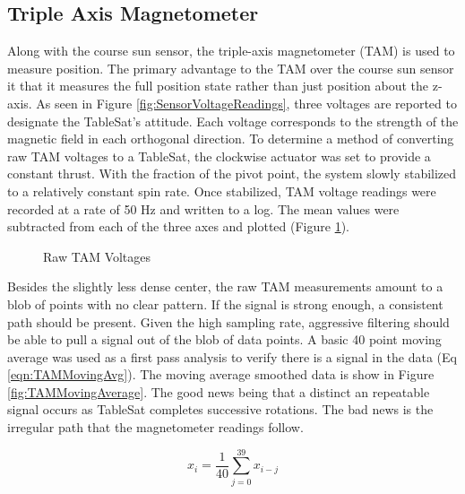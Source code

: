 \subsection{Triple Axis Magnetometer}
\label{subsec:TripleAxisMagnetometer}

Along with the course sun sensor, the triple-axis magnetometer (TAM) is used to measure position.  The primary advantage to the TAM over the course sun sensor it that it measures the full position state rather than just position about the z-axis.  As seen in Figure \ref{fig:SensorVoltageReadings}, three voltages are reported to designate the TableSat's attitude.  Each voltage corresponds to the strength of the magnetic field in each orthogonal direction.  To determine a method of converting raw TAM voltages to a TableSat, the clockwise actuator was set to provide a constant thrust.  With the fraction of the pivot point, the system slowly stabilized to a relatively constant spin rate.  Once stabilized, TAM voltage readings were recorded at a rate of 50 Hz and written to a log.  The mean values were subtracted from each of the three axes and plotted (Figure \ref{fig:TAMRaw}).

\begin{figure}[H]
\centerline{}
\caption{Raw TAM Voltages}
\label{fig:TAMRaw}
\end{figure}

Besides the slightly less dense center, the raw TAM measurements amount to a blob of points with no clear pattern.  If the signal is strong enough, a consistent path should be present.  Given the high sampling rate, aggressive filtering should be able to pull a signal out of the blob of data points.  A basic 40 point moving average was used as a first pass analysis to verify there is a signal in the data (Eq \ref{eqn:TAMMovingAvg}).  The moving average smoothed data is show in Figure \ref{fig:TAMMovingAverage}.  The good news being that a distinct an repeatable signal occurs as TableSat completes successive rotations.  The bad news is the irregular path that the magnetometer readings follow.

\begin{equation}
  x_i = \frac{1}{40} \sum^{39}_{j=0} x_{i-j}
  \label{eqn:TAMMovingAvg}
\end{equation}

